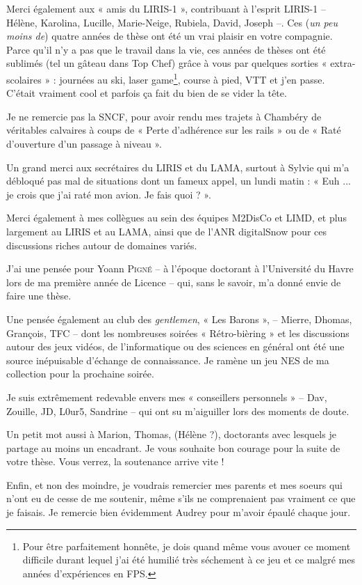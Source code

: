 Merci également aux « amis du LIRIS-1 », contribuant à l'esprit LIRIS-1 --
Hélène, Karolina, Lucille, Marie-Neige, Rubiela, David, Joseph --. Ces (\emph{un
peu moins de}) quatre années de thèse ont été un vrai plaisir en votre
compagnie. Parce qu'il n'y a pas que le travail dans la vie, ces années de
thèses ont été sublimés (tel un gâteau dans Top Chef) grâce à vous par quelques
sorties « extra-scolaires » : journées au ski, laser game\footnote{Pour être parfaitement honnête, je dois quand même vous avouer ce moment difficile durant lequel j'ai été humilié très séchement à ce jeu et ce malgré mes années d'expériences en FPS.}, course à pied, VTT et
j'en passe. C'était vraiment cool et parfois ça fait du bien de se vider la
tête.

Je ne remercie pas la SNCF, pour avoir rendu mes trajets à Chambéry de
véritables calvaires à coups de « Perte d'adhérence sur les rails » ou de «
Raté d'ouverture d'un passage à niveau ».

Un grand merci aux secrétaires du LIRIS et du LAMA, surtout à Sylvie qui m'a
débloqué pas mal de situations dont un fameux appel, un lundi matin : «
Euh ... je crois que j'ai raté mon avion. Je fais quoi ? ».

Merci également à mes collègues au sein des équipes M2DisCo et LIMD, et plus
largement au LIRIS et au LAMA, ainsi que de l'ANR digitalSnow pour ces
discussions riches autour de domaines variés.

J'ai une pensée pour Yoann \textsc{Pigné} -- à l'époque doctorant à l'Université
du Havre lors de ma première année de Licence -- qui, sans le savoir, m'a donné
envie de faire une thèse.

Une pensée également au club des \emph{gentlemen}, « Les Barons », -- Mierre,
Dhomas, Grançois, TFC -- dont les nombreuses soirées « Rétro-bièring » et les
discussions autour des jeux vidéos, de l'informatique ou des sciences en général
ont été une source inépuisable d'échange de connaissance. Je ramène un jeu NES
de ma collection pour la prochaine soirée.

Je suis extrêmement redevable envers mes « conseillers personnels » -- Dav,
 Zouille, JD, L0ur5, Sandrine -- qui ont su m'aiguiller lors des
moments de doute.

Un petit mot aussi à Marion, Thomas, (Hélène ?), doctorants avec lesquels je
partage au moins un encadrant. Je vous souhaite bon courage pour la suite de
votre thèse. Vous verrez, la soutenance arrive vite !

Enfin, et non des moindre, je voudrais remercier mes parents et mes soeurs qui
n'ont eu de cesse de me soutenir, même s'ils ne comprenaient pas vraiment ce que
je faisais. Je remercie bien évidemment Audrey pour m'avoir épaulé chaque jour.


